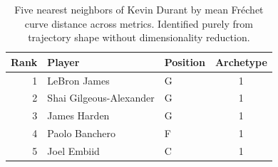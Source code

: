 \begin{table}[htbp]
  \centering\small
  \begin{tabular}{rllc}
    \toprule
    Rank & Player & Position & Archetype \\
    \midrule
    1 & LeBron James & G & 1 \\
    2 & Shai Gilgeous-Alexander & G & 1 \\
    3 & James Harden & G & 1 \\
    4 & Paolo Banchero & F & 1 \\
    5 & Joel Embiid & C & 1 \\
    \bottomrule
  \end{tabular}
  \caption{Five nearest neighbors of Kevin Durant by mean Fr\'{e}chet curve distance across metrics. Identified purely from trajectory shape without dimensionality reduction.}
  \label{tab:Kevin_Durant_frechet_curve_neighbors}
\end{table}

